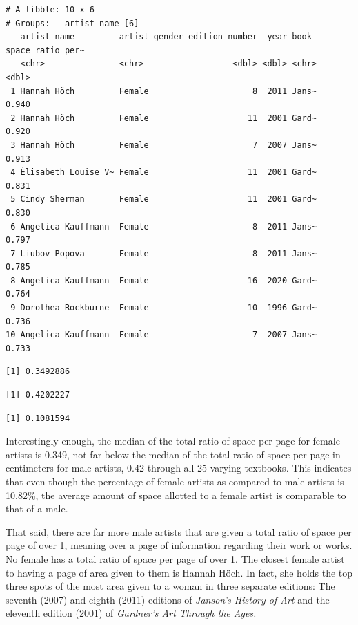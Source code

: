 \documentclass[
  letterpaper,
  DIV=11,
  numbers=noendperiod]{scrreprt}
\begin{document}
\begin{verbatim}
# A tibble: 10 x 6
# Groups:   artist_name [6]
   artist_name         artist_gender edition_number  year book  space_ratio_per~
   <chr>               <chr>                  <dbl> <dbl> <chr>            <dbl>
 1 Hannah Höch         Female                     8  2011 Jans~            0.940
 2 Hannah Höch         Female                    11  2001 Gard~            0.920
 3 Hannah Höch         Female                     7  2007 Jans~            0.913
 4 Élisabeth Louise V~ Female                    11  2001 Gard~            0.831
 5 Cindy Sherman       Female                    11  2001 Gard~            0.830
 6 Angelica Kauffmann  Female                     8  2011 Jans~            0.797
 7 Liubov Popova       Female                     8  2011 Jans~            0.785
 8 Angelica Kauffmann  Female                    16  2020 Gard~            0.764
 9 Dorothea Rockburne  Female                    10  1996 Gard~            0.736
10 Angelica Kauffmann  Female                     7  2007 Jans~            0.733
\end{verbatim}

\begin{verbatim}
[1] 0.3492886
\end{verbatim}

\begin{verbatim}
[1] 0.4202227
\end{verbatim}

\begin{verbatim}
[1] 0.1081594
\end{verbatim}

Interestingly enough, the median of the total ratio of space per page
for female artists is 0.349, not far below the median of the total ratio
of space per page in centimeters for male artists, 0.42 through all 25
varying textbooks\emph{.} This indicates that even though the percentage
of female artists as compared to male artists is 10.82\%, the average
amount of space allotted to a female artist is comparable to that of a
male.

That said, there are far more male artists that are given a total ratio
of space per page of over 1, meaning over a page of information
regarding their work or works. No female has a total ratio of space per
page of over 1. The closest female artist to having a page of area given
to them is Hannah Höch. In fact, she holds the top three spots of the
most area given to a woman in three separate editions: The seventh
(2007) and eighth (2011) editions of \emph{Janson's History of Art} and
the eleventh edition (2001) of \emph{Gardner's Art Through the Ages.}
\end{document}
